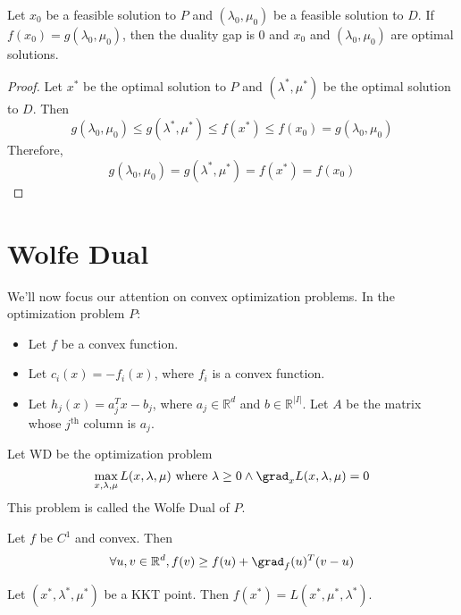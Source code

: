 \begin{corollary}
Let $x_0$ be a feasible solution to $P$ and $(\lambda_0, \mu_0)$ be a feasible solution to $D$.
If $f(x_0) = g(\lambda_0, \mu_0)$, then the duality gap is 0 and $x_0$ and $(\lambda_0, \mu_0)$ are optimal solutions.
\end{corollary}
\begin{proof}
Let $x^*$ be the optimal solution to $P$ and $(\lambda^*, \mu^*)$ be the optimal solution to $D$. Then
\[ g(\lambda_0, \mu_0) \le g(\lambda^*, \mu^*) \le f(x^*) \le f(x_0) = g(\lambda_0, \mu_0) \]
Therefore,
\[ g(\lambda_0, \mu_0) = g(\lambda^*, \mu^*) = f(x^*) = f(x_0) \]
\end{proof}

\section{Wolfe Dual}

We'll now focus our attention on convex optimization problems.
In the optimization problem $P$:
\begin{itemize}
\item Let $f$ be a convex function.
\item Let $c_i(x) = -f_i(x)$, where $f_i$ is a convex function.
\item Let $h_j(x) = a_j^Tx - b_j$, where $a_j \in \mathbb{R}^d$ and $b \in \mathbb{R}^{|I|}$.
Let $A$ be the matrix whose $j^{\textrm{th}}$ column is $a_j$.
\end{itemize}

Let WD be the optimization problem
\[ \max_{x, \lambda, \mu} L(x, \lambda, \mu) \textrm{ where } \lambda \ge 0
\wedge \grad_xL(x, \lambda, \mu) = 0 \]
This problem is called the Wolfe Dual of $P$.

\begin{theorem}
\label{thm:c1-convex}
Let $f$ be $C^1$ and convex. Then
\[ \forall u, v \in \mathbb{R}^d, f(v) \ge f(u) + \grad_f(u)^T(v-u) \]
\end{theorem}

\begin{lemma}
\label{thm:f-eq-lagr}
Let $(x^*, \lambda^*, \mu^*)$ be a KKT point.
Then $f(x^*) = L(x^*, \mu^*, \lambda^*)$.
\end{lemma}

